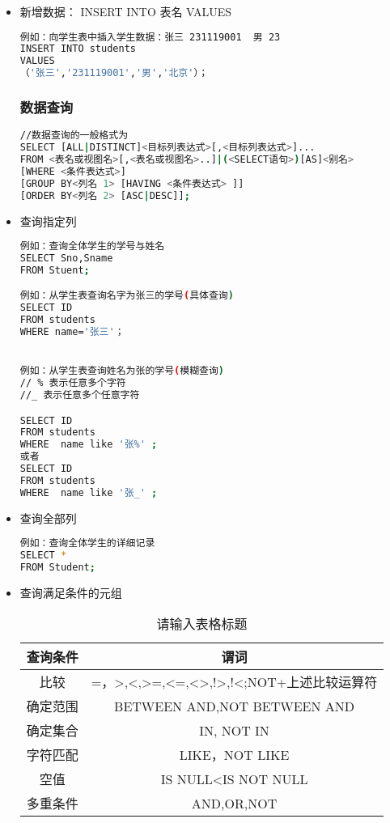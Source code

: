 \begin{itemize}
\item 新增数据： INSERT INTO 表名 VALUES
\begin{lstlisting}[language=bash]
例如：向学生表中插入学生数据：张三 231119001  男 23
INSERT INTO students
VALUES
（'张三','231119001','男','北京'）；
\end{lstlisting}
\subsubsection{数据查询}
\begin{lstlisting}[language=bash]
//数据查询的一般格式为
SELECT [ALL|DISTINCT]<目标列表达式>[,<目标列表达式>]...
FROM <表名或视图名>[,<表名或视图名>..]|(<SELECT语句>)[AS]<别名>
[WHERE <条件表达式>]
[GROUP BY<列名 1> [HAVING <条件表达式> ]]
[ORDER BY<列名 2> [ASC|DESC]];
\end{lstlisting}
\item 查询指定列
\begin{lstlisting}[language=bash]
例如：查询全体学生的学号与姓名
SELECT Sno,Sname
FROM Stuent;

例如：从学生表查询名字为张三的学号(具体查询)
SELECT ID
FROM students
WHERE name='张三'；


例如：从学生表查询姓名为张的学号(模糊查询)
// % 表示任意多个字符
//_ 表示任意多个任意字符

SELECT ID
FROM students
WHERE  name like '张%' ;
或者
SELECT ID
FROM students
WHERE  name like '张_' ;
\end{lstlisting}
\item  查询全部列
\begin{lstlisting}[language=bash]
例如：查询全体学生的详细记录
SELECT *
FROM Student;
\end{lstlisting}
\item 查询满足条件的元组
\begin{table}[ht]
\centering
\caption{请输入表格标题}\label{tab_SQLgrm1}
\begin{tabular}{|c|c|}
\hline
查询条件& 谓词 \\
\hline
比较 & =，>,<,>=,<=,<>,!>,!<;NOT+上述比较运算符 \\
\hline
确定范围& BETWEEN AND,NOT BETWEEN AND \\
\hline
确定集合 & IN, NOT IN \\
\hline
字符匹配 & LIKE，NOT LIKE\\
\hline
空值& IS NULL<IS NOT NULL \\
\hline
多重条件 & AND,OR,NOT \\
\hline
\end{tabular}
\end{table}



\end{itemize}
